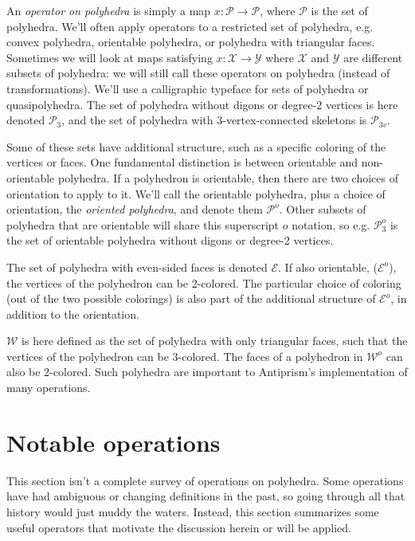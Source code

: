 \documentclass{amsart}[12pt]
\begin{document}
An \textit{operator on polyhedra} is simply a map $x : \mathcal{P} \to
\mathcal{P}$, where $\mathcal{P}$ is the set of polyhedra. We'll often apply
operators to a restricted set of polyhedra, e.g. convex polyhedra, orientable
polyhedra, or polyhedra with triangular faces. Sometimes we will look at maps
satisfying $x : \mathcal{X} \to \mathcal{Y}$ where $\mathcal{X}$ and
$\mathcal{Y}$ are different subsets of polyhedra: we will still call these
operators on polyhedra (instead of transformations). We'll use a calligraphic
typeface for sets of polyhedra or quasipolyhedra. The set of polyhedra without
digons or degree-2 vertices is here denoted $\mathcal{P}_3$, and the set of
polyhedra with 3-vertex-connected skeletons is $\mathcal{P}_{3v}$.

Some of these sets have additional structure, such as a specific coloring of
the vertices or faces. One fundamental distinction is between orientable and
non-orientable polyhedra. If a polyhedron is orientable, then there are two
choices of orientation to apply to it. We'll call the orientable polyhedra,
plus a choice of orientation, the \textit{oriented polyhedra}, and denote them
$\mathcal{P}^o$. Other subsets of polyhedra that are orientable will share this
superscript $o$ notation, so e.g. $\mathcal{P}^o_3$ is the set of orientable
polyhedra without digons or degree-2 vertices.

The set of polyhedra with even-sided faces is denoted $\mathcal{E}$. If also
orientable, ($\mathcal{E}^o$), the vertices of the polyhedron can be 2-colored.
The particular choice of coloring (out of the two possible colorings) is also
part of the additional structure of $\mathcal{E}^o$,
in addition to the orientation.

$\mathcal{W}$ is here defined as the set of polyhedra with only triangular
faces, such that the vertices of the polyhedron can be 3-colored. The faces of
a polyhedron in $\mathcal{W}^o$ can also be 2-colored. Such polyhedra are
important to Antiprism's implementation of many operations.

\section{Notable operations}

This section isn't a complete survey of operations on polyhedra. Some
operations have had ambiguous or changing definitions in the past, so going
through all that history would just muddy the waters. Instead, this section
summarizes some useful operators that motivate the discussion herein or will
be applied.
\end{document}
